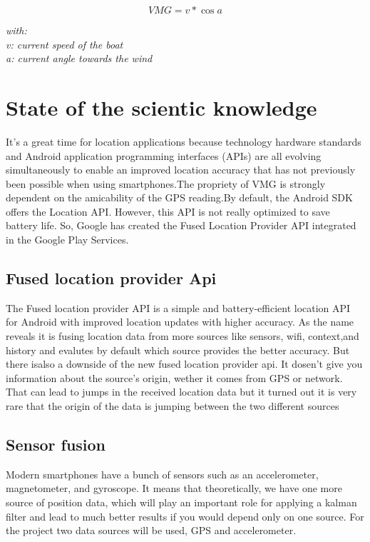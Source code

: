 \begin{equation_caption}[!ht]

\begin{equation}
VMG = v * \cos a  \label{VMG}
\end{equation}

   \caption{
\textit{
   with: \\
 v: current speed of the boat\\
 a: current angle towards the wind
 }
  }

\end{equation_caption}




\chapter{State of the scientic knowledge}
It’s a great time for location applications because technology hardware standards and Android application programming interfaces (APIs) are all evolving simultaneously to enable an improved location accuracy that has not previously been possible when using smartphones.The propriety of VMG is strongly dependent on the amicability of the GPS reading.By default, the Android SDK offers the Location API. However, this API is not really optimized to save battery life. So, Google has created the Fused Location Provider API integrated in the Google Play Services.

\section{Fused location provider Api}
The Fused location provider API is a simple and battery-efficient location API for Android with improved location updates with higher accuracy. As the name reveals it is fusing location data from more sources like sensors, wifi, context,and history and evalutes by default which source provides the better accuracy. But there isalso a downside of the new fused location provider api. It dosen't give you information about the source's origin, wether it comes from GPS or network. That can lead to jumps in the received location data but it turned out it is very rare that the origin of the data is jumping between the two different sources

\section{Sensor fusion}
Modern smartphones have a bunch of sensors such as an accelerometer, magnetometer, and gyroscope. It means that theoretically, we have one more source of position data, which will play an important role for applying a kalman filter and lead to much better results if you would depend only on one source. For the project two data sources will be used, GPS and accelerometer.

